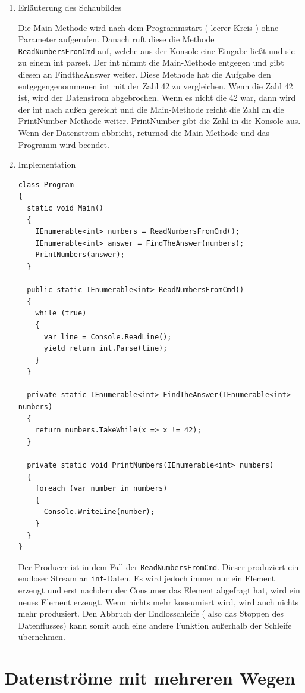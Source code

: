 \begin{enumerate}
\item Erläuterung des Schaubildes

Die  Main-Methode wird nach dem Programmstart ( leerer Kreis ) ohne Parameter aufgerufen.
Danach ruft diese die Methode \\\texttt{ReadNumbersFromCmd} auf, welche aus der Konsole eine Eingabe ließt und sie
zu einem int parset. Der int nimmt die Main-Methode entgegen und gibt diesen an FindtheAnswer weiter.
Diese Methode hat die Aufgabe den entgegengenommenen int mit der Zahl 42 zu vergleichen. Wenn die Zahl 42 ist, wird der Datenstrom
abgebrochen. Wenn es nicht die 42 war, dann wird der int nach außen gereicht und die  Main-Methode reicht die Zahl an die
PrintNumber-Methode weiter. PrintNumber gibt die Zahl in die Konsole aus.
Wenn der Datenstrom abbricht, returned die Main-Methode und das Programm wird beendet.

\item Implementation

\begin{lstlisting}
class Program
{
  static void Main()
  {
    IEnumerable<int> numbers = ReadNumbersFromCmd();
    IEnumerable<int> answer = FindTheAnswer(numbers);
    PrintNumbers(answer);
  }

  public static IEnumerable<int> ReadNumbersFromCmd()
  {
    while (true)
    {
      var line = Console.ReadLine();
      yield return int.Parse(line);
    }
  }

  private static IEnumerable<int> FindTheAnswer(IEnumerable<int> numbers)
  {
    return numbers.TakeWhile(x => x != 42);
  }

  private static void PrintNumbers(IEnumerable<int> numbers)
  {
    foreach (var number in numbers)
    {
      Console.WriteLine(number);
    }
  }
}
\end{lstlisting}

Der Producer ist in dem Fall der \texttt{ReadNumbersFromCmd}.
Dieser produziert ein endloser Stream an \texttt{int}-Daten.
Es wird jedoch immer nur ein Element erzeugt und erst nachdem der Consumer das
Element abgefragt hat, wird ein neues Element erzeugt.
Wenn nichts mehr konsumiert wird, wird auch nichts mehr produziert.
Den Abbruch der Endlosschleife ( also das Stoppen des Datenflusses) kann somit auch eine andere Funktion außerhalb der Schleife
übernehmen.
\end{enumerate}




\section{Datenströme mit mehreren Wegen}

